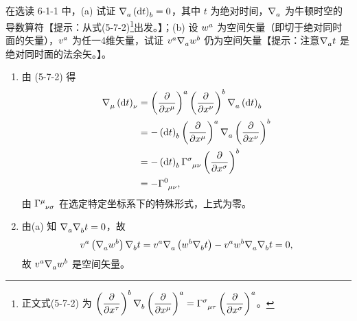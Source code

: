 \begin{xiti}
	\item 在选读 6-1-1 中，(a) 试证 $\Nabla{a} \tensor{\left( \dd{t} \right)}{_b} = 0$，其中 $t$ 为绝对时间，$\Nabla{a}$ 为牛顿时空的导数算符【提示：从式(5-7-2)\footnote{正文式(5-7-2) 为 $\displaystyle \tensor{\left( \pdv{x^\tau} \right)}{^b} \Nabla{b} \tensor{\left( \pdv{x^\mu} \right)}{^a} = \ChristoffelSymbol{\sigma}{\mu}{\tau} \tensor{\left( \pdv{x^\sigma} \right)}{^a}$。}出发。】；(b) 设 $\tensor{w}{^a}$ 为空间矢量（即切于绝对同时面的矢量），$\tensor{v}{^a}$ 为任一4维矢量，试证 $\tensor{v}{^a} \Nabla{a} \tensor{w}{^b}$ 仍为空间矢量【提示：注意$\Nabla{a} t$ 是绝对同时面的法余矢。】。

		\begin{zm}
			\begin{enumerate}[label=(\alph*)]
				\item 由 (5-7-2) 得
				\begin{equation*}
					\begin{split}
						\Nabla{\mu} \tensor{\left( \dd{t} \right)}{_\nu} &= \tensor{\left( \pdv{x^\mu} \right)}{^a} \tensor{\left( \pdv{x^\nu} \right)}{^b} \Nabla{a} \tensor{\left( \dd{t} \right)}{_b}\\
						&= - \tensor{\left( \dd{t} \right)}{_b} \tensor{\left( \pdv{x^\mu} \right)}{^a} \Nabla{a} \tensor{\left( \pdv{x^\nu} \right)}{^b}\\
						&= - \tensor{\left( \dd{t} \right)}{_b} \ChristoffelSymbol{\sigma}{\mu}{\nu} \tensor{\left( \pdv{x^\sigma} \right)}{^b}\\
						&= - \ChristoffelSymbol{0}{\mu}{\nu},
					\end{split}
				\end{equation*}
				由 $\ChristoffelSymbol{\mu}{\nu}{\sigma}$ 在选定特定坐标系下的特殊形式，上式为零。
				\item 由(a) 知 $\Nabla{a} \Nabla{b} t =0$，故
				\begin{equation*}
					\tensor{v}{^a} \left( \Nabla{a} \tensor{w}{^b} \right) \Nabla{b} t = \tensor{v}{^a} \Nabla{a} \left( \tensor{w}{^b} \Nabla{b} t \right) - \tensor{v}{^a} \tensor{w}{^b} \Nabla{a} \Nabla{b} t = 0,
				\end{equation*}
				故 $\tensor{v}{^a} \Nabla{a} \tensor{w}{^b}$ 是空间矢量。
			\end{enumerate}
		\end{zm}

\end{xiti}
